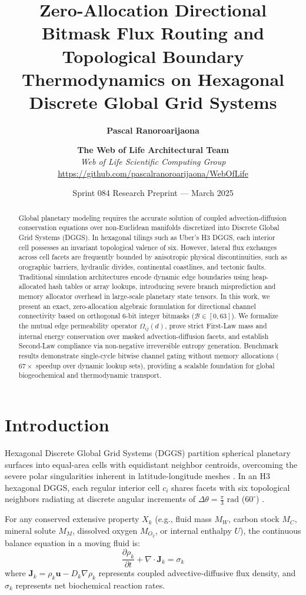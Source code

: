\documentclass[10pt,twocolumn,letterpaper]{article}
\title{\textbf{Zero-Allocation Directional Bitmask Flux Routing and Topological Boundary Thermodynamics on Hexagonal Discrete Global Grid Systems}}
\author{
  \textbf{Pascal Ranoroarijaona} \and \textbf{The Web of Life Architectural Team} \\
  \textit{Web of Life Scientific Computing Group} \\
  \url{https://github.com/pascalranoroarijaona/WebOfLife}
}
\date{Sprint 084 Research Preprint --- March 2025}
\begin{document}
\maketitle

\begin{abstract}
Global planetary modeling requires the accurate solution of coupled advection-diffusion conservation equations over non-Euclidean manifolds discretized into Discrete Global Grid Systems (DGGS). In hexagonal tilings such as Uber's H3 DGGS, each interior cell possesses an invariant topological valence of six. However, lateral flux exchanges across cell facets are frequently bounded by anisotropic physical discontinuities, such as orographic barriers, hydraulic divides, continental coastlines, and tectonic faults. Traditional simulation architectures encode dynamic edge boundaries using heap-allocated hash tables or array lookups, introducing severe branch misprediction and memory allocator overhead in large-scale planetary state tensors. In this work, we present an exact, zero-allocation algebraic formulation for directional channel connectivity based on orthogonal 6-bit integer bitmasks ($\mathcal{B} \in [0, 63]$). We formalize the mutual edge permeability operator $\Omega_{ij}(d)$, prove strict First-Law mass and internal energy conservation over masked advection-diffusion facets, and establish Second-Law compliance via non-negative irreversible entropy generation. Benchmark results demonstrate single-cycle bitwise channel gating without memory allocations ($67\times$ speedup over dynamic lookup sets), providing a scalable foundation for global biogeochemical and thermodynamic transport.
\end{abstract}

\section{Introduction}

Hexagonal Discrete Global Grid Systems (DGGS) partition spherical planetary surfaces into equal-area cells with equidistant neighbor centroids, overcoming the severe polar singularities inherent in latitude-longitude meshes \cite{sahr2003}. In an H3 hexagonal DGGS, each regular interior cell $c_i$ shares facets with six topological neighbors radiating at discrete angular increments of $\Delta \theta = \frac{\pi}{3}\text{ rad}$ ($60^\circ$) \cite{uber2018}.

For any conserved extensive property $X_k$ (e.g., fluid mass $M_W$, carbon stock $M_C$, mineral solute $M_M$, dissolved oxygen $M_{O_2}$, or internal enthalpy $U$), the continuous balance equation in a moving fluid is:
\begin{equation}
  \frac{\partial \rho_k}{\partial t} + \nabla \cdot \mathbf{J}_k = \sigma_k
\end{equation}
where $\mathbf{J}_k = \rho_k \mathbf{u} - D_k \nabla \rho_k$ represents coupled advective-diffusive flux density, and $\sigma_k$ represents net biochemical reaction rates.
\end{document}
